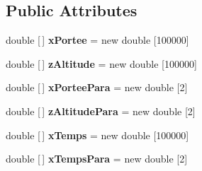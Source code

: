 \subsection*{Public Attributes}
\begin{DoxyCompactItemize}
\item 
\mbox{\label{classpackage_i_h_m_1_1_fusee_a4af02137cee1c590c23dab2d5d5a48de}} 
double \mbox{[}$\,$\mbox{]} {\bfseries x\+Portee} = new double \mbox{[}100000\mbox{]}
\item 
\mbox{\label{classpackage_i_h_m_1_1_fusee_ad3e645fa8b4b8f1ded8f9357fe07cdda}} 
double \mbox{[}$\,$\mbox{]} {\bfseries z\+Altitude} = new double \mbox{[}100000\mbox{]}
\item 
\mbox{\label{classpackage_i_h_m_1_1_fusee_a613d1147416316173afcab43b87b7da3}} 
double \mbox{[}$\,$\mbox{]} {\bfseries x\+Portee\+Para} = new double \mbox{[}2\mbox{]}
\item 
\mbox{\label{classpackage_i_h_m_1_1_fusee_a8d678c5b723532709a62fdf5a75f50db}} 
double \mbox{[}$\,$\mbox{]} {\bfseries z\+Altitude\+Para} = new double \mbox{[}2\mbox{]}
\item 
\mbox{\label{classpackage_i_h_m_1_1_fusee_abb5496bb598c4adb7a7635497bcd284d}} 
double \mbox{[}$\,$\mbox{]} {\bfseries x\+Temps} = new double \mbox{[}100000\mbox{]}
\item 
\mbox{\label{classpackage_i_h_m_1_1_fusee_ada42dce510330a82f7a939c2a7e0c508}} 
double \mbox{[}$\,$\mbox{]} {\bfseries x\+Temps\+Para} = new double \mbox{[}2\mbox{]}
\end{DoxyCompactItemize}
